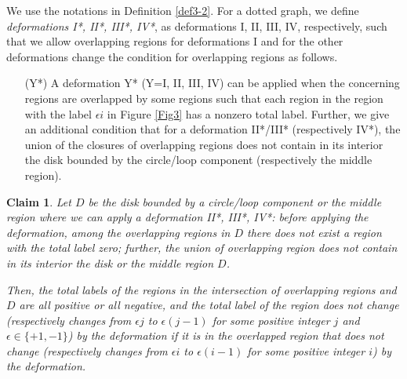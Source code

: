 \documentclass[a4paper,11pt]{amsart}
\numberwithin{equation}{section}
\newtheorem{claim}[theorem]{Claim}
\begin{document}
\begin{definition}\label{def3-7}
We use the notations in Definition \ref{def3-2}. 
For a dotted graph, 
we define {\it deformations I*, II*, III*, IV*}, as 
deformations I, II, III, IV, respectively, 
such that we allow overlapping regions for deformations I and for the other deformations change the condition for overlapping regions as follows.  


\begin{enumerate}


\item[(Y*)]
A deformation Y* (Y=I, II, III, IV) can be applied when the concerning regions are overlapped by some regions 
such that each region in the region with the label $\epsilon i$ in Figure \ref{Fig3} has a nonzero total label. 
Further, we give an additional condition that for a deformation II*/III* (respectively IV*), the union of the closures of overlapping regions does not contain in its interior the disk bounded by the circle/loop component (respectively the middle region). 

 
\end{enumerate}
\end{definition}

\begin{claim}\label{rem2-6}
Let $D$ be the disk bounded by a circle/loop component or the middle region where we can apply a deformation II*, III*, IV*: before applying the deformation, among the overlapping regions 
in $D$ there does not exist a region with the total label zero; further, 
the union of overlapping region does not contain in its interior the disk or the middle region $D$. 

Then, the total labels of the regions in the intersection of overlapping regions and $D$ are all positive or all negative, and the total label of the region does not change (respectively changes from $\epsilon j$ to $\epsilon (j-1)$ for some positive integer $j$ and $\epsilon \in \{+1, -1\}$) by the deformation if it is in the overlapped region that does not change (respectively changes from $\epsilon i$ to $\epsilon (i-1)$ for some positive integer $i$) by the deformation. 
\end{claim}
 
\end{document}
